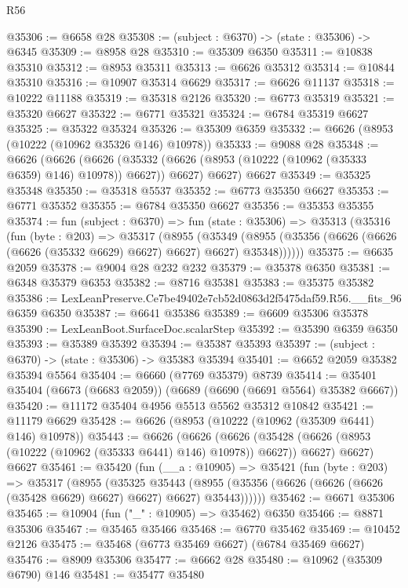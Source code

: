 \begin{lexlean}{R56}
\begin{coremodule}
@35306 := @6658 @28
@35308 := (subject : @6370) -> (state : @35306) -> @6345
@35309 := @8958 @28
@35310 := @35309 @6350
@35311 := @10838 @35310
@35312 := @8953 @35311
@35313 := @6626 @35312
@35314 := @10844 @35310
@35316 := @10907 @35314 @6629
@35317 := @6626 @11137
@35318 := @10222 @11188
@35319 := @35318 @2126
@35320 := @6773 @35319
@35321 := @35320 @6627
@35322 := @6771 @35321
@35324 := @6784 @35319 @6627
@35325 := @35322 @35324
@35326 := @35309 @6359
@35332 := @6626 (@8953 (@10222 (@10962 @35326 @146) @10978))
@35333 := @9088 @28
@35348 := @6626
    (@6626
      (@6626 (@35332 (@6626 (@8953 (@10222 (@10962 (@35333 @6359) @146) @10978)) @6627)) @6627)
      @6627)
    @6627
@35349 := @35325 @35348
@35350 := @35318 @5537
@35352 := @6773 @35350 @6627
@35353 := @6771 @35352
@35355 := @6784 @35350 @6627
@35356 := @35353 @35355
@35374 := fun (subject : @6370) =>
  fun (state : @35306) =>
  @35313
    (@35316
      (fun (byte : @203) =>
      @35317
        (@8955
          (@35349
            (@8955 (@35356 (@6626 (@6626 (@6626 (@35332 @6629) @6627) @6627) @6627) @35348))))))
@35375 := @6635 @2059
@35378 := @9004 @28 @232 @232
@35379 := @35378 @6350
@35381 := @6348 @35379 @6353
@35382 := @8716 @35381
@35383 := @35375 @35382
@35386 := LexLeanPreserve.Ce7be49402e7cb52d0863d2f5475daf59.R56.__fits_96 @6359 @6350
@35387 := @6641 @35386
@35389 := @6609 @35306 @35378
@35390 := LexLeanBoot.SurfaceDoc.scalarStep
@35392 := @35390 @6359 @6350
@35393 := @35389 @35392
@35394 := @35387 @35393
@35397 := (subject : @6370) -> (state : @35306) -> @35383 @35394
@35401 := @6652 @2059 @35382 @35394 @5564
@35404 := @6660 (@7769 @35379) @8739
@35414 := @35401 @35404 (@6673 (@6683 @2059)) (@6689 (@6690 (@6691 @5564) @35382 @6667))
@35420 := @11172 @35404 @4956 @5513 @5562 @35312 @10842
@35421 := @11179 @6629
@35428 := @6626 (@8953 (@10222 (@10962 (@35309 @6441) @146) @10978))
@35443 := @6626
    (@6626
      (@6626 (@35428 (@6626 (@8953 (@10222 (@10962 (@35333 @6441) @146) @10978)) @6627)) @6627)
      @6627)
    @6627
@35461 := @35420
    (fun (__a : @10905) =>
    @35421
      (fun (byte : @203) =>
      @35317
        (@8955
          (@35325
            @35443
            (@8955 (@35356 (@6626 (@6626 (@6626 (@35428 @6629) @6627) @6627) @6627) @35443))))))
@35462 := @6671 @35306
@35465 := @10904 (fun ("_" : @10905) => @35462) @6350
@35466 := @8871 @35306
@35467 := @35465 @35466
@35468 := @6770 @35462
@35469 := @10452 @2126
@35475 := @35468 (@6773 @35469 @6627) (@6784 @35469 @6627)
@35476 := @8909 @35306
@35477 := @6662 @28
@35480 := @10962 (@35309 @6790) @146
@35481 := @35477 @35480

\end{coremodule}
\end{lexlean}
